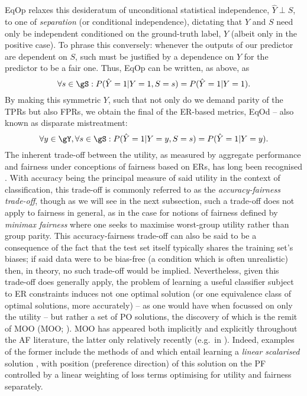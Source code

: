 %
%
\Acf{EqOp} relaxes this desideratum of unconditional statistical independence, \(\hat{Y} \perp S\),
to one of \emph{separation} (or conditional independence), dictating that \(\hat{Y}\) and \(S\)
need only be independent conditioned on the ground-truth label, \(Y\) (albeit only in the positive
case).
%
To phrase this conversely: whenever the outputs of our predictor are dependent on \(S\), such must be
justified by a dependence on \(Y\) for the predictor to be a fair one.
%
Thus, \ac{EqOp} can be written, as above, as
%
\begin{equation}
    \forall s \in \gS: P( \hat{Y}=1|Y=1, S=s ) = P(\hat{Y}=1|Y=1).
\end{equation}
%
%
By making this symmetric \wrt{} \(Y\), such that not only do we demand parity of the \acp{TPR} but
also \acp{FPR}, we obtain the final of the \ac{ER}-based metrics, \ac{EqOd}
\citep{hardt2016equality} -- also known as disparate mistreatment:
%
\begin{equation}
    \forall y \in \gY, \forall s \in \gS: P( \hat{Y}=1|Y=y, S=s ) = P( \hat{Y}=1|Y=y ).
\end{equation}
%
%
The inherent trade-off between the utility, as measured by aggregate performance and fairness under
conceptions of fairness based on \acp{ER}, has long been recognised \citep{kaplow1999conflict}. 
%
With accuracy being the principal measure of said utility in the context of classification, this
trade-off is commonly referred to as the \emph{accuracy-fairness trade-off}, though as we will see
in the next subsection, such a trade-off does not apply to fairness in general, as in the case for
notions of fairness defined by \emph{minimax fairness} where one seeks to maximise worst-group
utility rather than group parity.
%
This accuracy-fairness trade-off can also be said to be a consequence of the fact that the test set
itself typically shares the training set's biases; if said data were to be bias-free (a condition
which is often unrealistic) then, in theory, no such trade-off would be implied.
%
Nevertheless, given this trade-off does generally apply, the problem of learning a useful
classifier subject to \ac{ER} constraints induces not one optimal solution (or one equivalence
class of optimal solutions, more accurately) -- as one would have when focussed on only the utility
-- but rather a set of \ac{PO} solutions, the discovery of which is the remit of \acl{MOO}
(\ac{MOO}; \citealp{sawaragi1985theory, deb2013multi}). 
%
\Ac{MOO} has appeared both implicitly and explicitly throughout the \ac{AF} literature, the latter
only relatively recently (e.g.\ in \citealp{navon2020learning}). 
%
Indeed, examples of the former include the methods of \citet{louizos2015variational} and
\citet{madras2018learning} which entail learning a \emph{linear scalarised} solution
\citep{boyd2004convex},  with position (preference direction) of this solution on the \acf{PF}
controlled by a linear weighting of loss terms optimising for utility and fairness separately.
%
